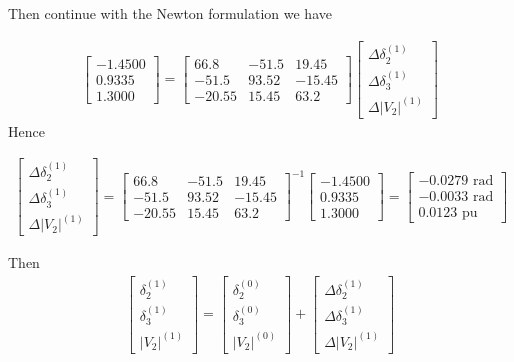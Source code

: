 \documentclass[11pt, oneside, reqno]{amsart}
\numberwithin{equation}{section}
\theoremstyle{plain}%
\theoremstyle{definition}
\theoremstyle{remark}
\begin{document}
Then continue with the Newton formulation we have

\begin{align*}
	\begin{bmatrix}
		-1.4500\\
		0.9335\\
		1.3000
	\end{bmatrix}
	=
	\begin{bmatrix}
		66.8 & -51.5 & 19.45\\
		-51.5 & 93.52 & -15.45\\
		-20.55 & 15.45 & 63.2
	\end{bmatrix}
	\begin{bmatrix}
		\Delta \delta^{(1)}_2\\
		\Delta \delta^{(1)}_3\\
		\Delta |V_2|^{(1)}
	\end{bmatrix}
\end{align*}
Hence

\begin{align*}
		\begin{bmatrix}
		\Delta \delta^{(1)}_2\\
		\Delta \delta^{(1)}_3\\
		\Delta |V_2|^{(1)}
	\end{bmatrix}
	= 	\begin{bmatrix}
		66.8 & -51.5 & 19.45\\
		-51.5 & 93.52 & -15.45\\
		-20.55 & 15.45 & 63.2
	\end{bmatrix}^{-1}
		\begin{bmatrix}
		-1.4500\\
		0.9335\\
		1.3000
	\end{bmatrix}
	= 
		\begin{bmatrix}
		-0.0279 \text{ rad}\\
		-0.0033 \text{ rad}\\
		0.0123 \text{ pu}
	\end{bmatrix}
\end{align*}

Then 
\begin{align*}
	\begin{bmatrix}
		 \delta^{(1)}_2\\
		 \delta^{(1)}_3\\
		  |V_2|^{(1)}
	\end{bmatrix}
= 	\begin{bmatrix}
		 \delta^{(0)}_2\\
		 \delta^{(0)}_3\\
		  |V_2|^{(0)}
	\end{bmatrix}
+
	\begin{bmatrix}
		\Delta \delta^{(1)}_2\\
		\Delta \delta^{(1)}_3\\
		\Delta |V_2|^{(1)}
	\end{bmatrix}
\end{align*}
\end{document}

